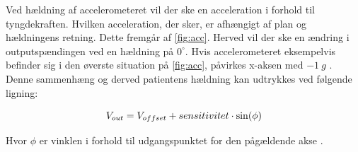 \noindent
Ved hældning af accelerometeret vil der ske en acceleration i forhold til tyngdekraften. Hvilken acceleration, der sker, er afhængigt af plan og hældningens retning. Dette fremgår af \autoref{fig:acc}. Herved vil der ske en ændring i outputspændingen ved en hældning på $0^{\circ}$. Hvis accelerometeret eksempelvis befinder sig i den øverste situation på \autoref{fig:acc}, påvirkes x-aksen med $-1~g$ \citep{clifford2005}. Denne sammenhæng og derved patientens hældning kan udtrykkes ved følgende ligning: 

\begin{equation} \label{equ:vinkler}
	V_{out} = V_{offset} + sensitivitet \cdot \sin(\phi) \\
\end{equation}

\noindent
Hvor $\phi$ er vinklen i forhold til udgangspunktet for den pågældende akse \citep{clifford2005}.